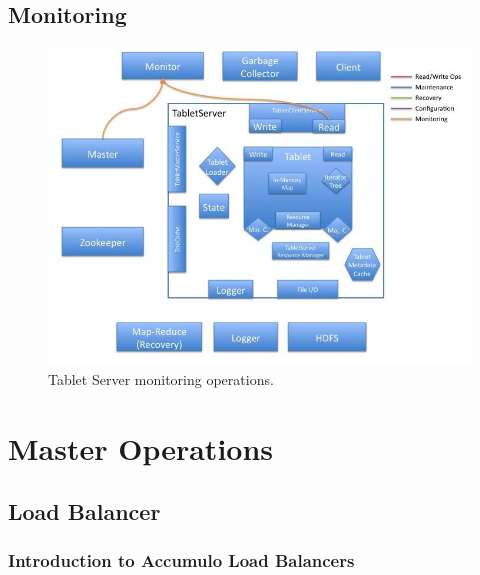 \documentclass[letterpaper,onecolumn,12pt,titlepage]{article}
\begin{document}
\subsection{Monitoring}
\begin{figure}[htbp]
\center
\includegraphics[scale=.6]{images/tserver_monitor.jpg}
\caption{\label{fig_ts_monitor} Tablet Server monitoring operations.}
\end{figure}

\section{Master Operations}
\subsection{Load Balancer}
\subsubsection{Introduction to Accumulo Load Balancers}
\end{document}
